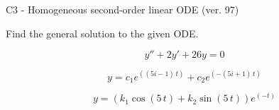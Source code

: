 \begin{exercise}
  \begin{exerciseTitle}C3 - Homogeneous second-order linear ODE (ver. 97)\end{exerciseTitle}
  \begin{exerciseStatement}
    
Find the general solution to the given ODE.

    
\[y''+2y'+26y = 0\]

  \end{exerciseStatement}
  \begin{exerciseAnswer}
    
\[y= c_{1} e^{\left(\left(5 i - 1\right) \, t\right)} + c_{2} e^{\left(-\left(5 i + 1\right) \, t\right)}\]

    
\[y= {\left(k_{1} \cos\left(5 \, t\right) + k_{2} \sin\left(5 \, t\right)\right)} e^{\left(-t\right)}\]

  \end{exerciseAnswer}
\end{exercise}